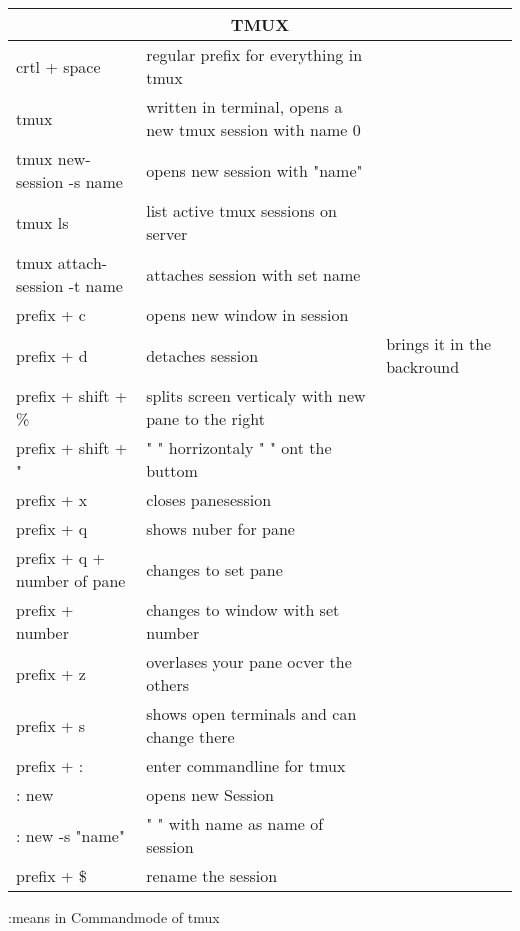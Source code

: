 \documentclass[12pt]{article}
\begin{document}
\begin{tabular}{| p{6.5cm} | p{6.5cm} | p{6.5cm} |}
    \hline
    \multicolumn{3}{|c|}{TMUX} \\
    \hline
    crtl + space & regular prefix for everything in tmux & \\
    \hline
    tmux & written in terminal, opens a new tmux session with name 0 & \\
    \hline
    tmux new-session -s name & opens new session with "name" & \\
    \hline 
    tmux ls & list active tmux sessions on server & \\
    \hline
    tmux attach-session -t name & attaches session with set name & \\
    \hline 
    prefix + c & opens new window in session & \\
    \hline
    prefix + d & detaches session & brings it in the backround \\
    \hline
    prefix + shift + \% & splits screen verticaly with new pane to the right & \\
    \hline
    prefix + shift + " & " " horrizontaly " " ont the buttom & \\
    \hline 
    prefix + x & closes pane\/session & \\
    \hline 
    prefix + q & shows nuber for pane & \\
    \hline 
    prefix + q + number of pane & changes to set pane & \\
    \hline
    prefix + number & changes to window with set number & \\
    \hline
    prefix + z & overlases your pane ocver the others & \\
    \hline
    prefix + s & shows open terminals and can change there & \\
    \hline
    prefix + : & enter commandline for tmux & \\
    \hline
    : new & opens new Session & \\
    \hline
    : new -s "name" & " " with name as name of session & \\
    \hline
    prefix + \$ & rename the session & \\
    \hline
\end{tabular}
 :means in Commandmode of tmux

\newpage
\end{document}
